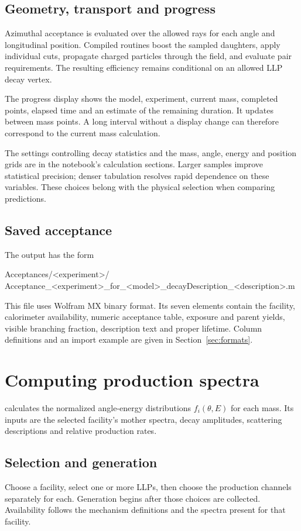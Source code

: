 \subsection{Geometry, transport and progress}
Azimuthal acceptance is evaluated over the allowed rays for each angle and longitudinal position. Compiled routines boost the sampled daughters, apply individual cuts, propagate charged particles through the field, and evaluate pair requirements. The resulting efficiency remains conditional on an allowed LLP decay vertex.

The progress display shows the model, experiment, current mass, completed points, elapsed time and an estimate of the remaining duration. It updates between mass points. A long interval without a display change can therefore correspond to the current mass calculation.

The settings controlling decay statistics and the mass, angle, energy and position grids are in the notebook's calculation sections. Larger samples improve statistical precision; denser tabulation resolves rapid dependence on these variables. These choices belong with the physical selection when comparing predictions.

\subsection{Saved acceptance}
The output has the form
\begin{Code}
Acceptances/<experiment>/
  Acceptance_<experiment>_for_<model>_decayDescription_<description>.m
\end{Code}
This file uses Wolfram MX binary format. Its seven elements contain the facility, calorimeter availability, numeric acceptance table, exposure and parent yields, visible branching fraction, description text and proper lifetime. Column definitions and an import example are given in Section~\ref{sec:formats}.

\section{Computing production spectra}\label{sec:production}
 calculates the normalized angle-energy distributions $f_i(\theta,E)$ for each mass. Its inputs are the selected facility's mother spectra, decay amplitudes, scattering descriptions and relative production rates.

\subsection{Selection and generation}
Choose a facility, select one or more LLPs, then choose the production channels separately for each. Generation begins after those choices are collected. Availability follows the mechanism definitions and the spectra present for that facility.

